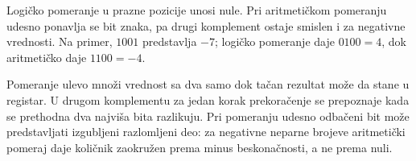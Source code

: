 Logičko pomeranje u prazne pozicije unosi nule. Pri aritmetičkom pomeranju udesno ponavlja se bit znaka, pa drugi komplement ostaje smislen i za negativne vrednosti. Na primer, $1001$ predstavlja $-7$; logičko pomeranje daje $0100=4$, dok aritmetičko daje $1100=-4$.

Pomeranje ulevo množi vrednost sa dva samo dok tačan rezultat može da stane u registar. U drugom komplementu za jedan korak prekoračenje se prepoznaje kada se prethodna dva najviša bita razlikuju. Pri pomeranju udesno odbačeni bit može predstavljati izgubljeni razlomljeni deo: za negativne neparne brojeve aritmetički pomeraj daje količnik zaokružen prema minus beskonačnosti, a ne prema nuli.
